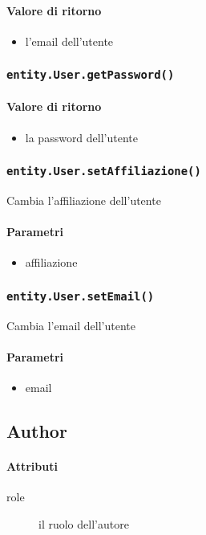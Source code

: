 \paragraph{Valore di ritorno}
\begin{itemize}
\item l'email dell'utente
\end{itemize}

\subsubsection{\texttt{entity.User.getPassword()}}
\paragraph{Valore di ritorno}
\begin{itemize}
\item la password dell'utente
\end{itemize}

\subsubsection{\texttt{entity.User.setAffiliazione()}}
Cambia l'affiliazione dell'utente
\paragraph{Parametri}
\begin{itemize}
\item affiliazione
\end{itemize}

\subsubsection{\texttt{entity.User.setEmail()}}
Cambia l'email dell'utente
\paragraph{Parametri}
\begin{itemize}
\item email
\end{itemize}

\subsection{Author}
\paragraph{Attributi}
\begin{description}
\item [role] il ruolo dell'autore
\end{description}

